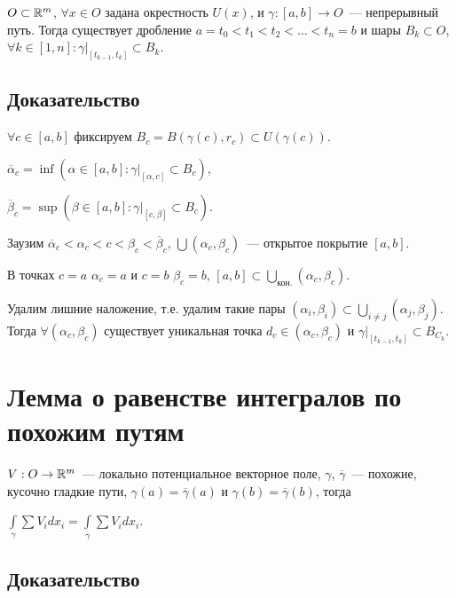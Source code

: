 \documentclass{article}
\begin{document}
        $O \subset \mathbb{R}^m$, $\forall x \in O$ задана окрестность $U(x)$, и $\gamma : [a, b] \rightarrow O$~--- непрерывный путь. Тогда существует дробление $a = t_0 < t_1 < t_2 < \ldots < t_n = b$ и шары $B_k \subset O$, $\forall k \in [1, n] : \gamma \big|_{[t_{k - 1}, t_k]} \subset B_k$.
        
        \subsection{Доказательство}
        
            $\forall c \in [a, b]$ фиксируем $B_c = B \left( \gamma(c), r_c \right) \subset U \left( \gamma (c) \right)$.
            
            $\overline{\alpha}_c = \inf \left( \alpha \in [a, b] : \gamma \bigg|_{[\alpha, c]} \subset B_c \right)$,
            
            $\overline{\beta}_c = \sup \left( \beta \in [a, b] : \gamma \bigg|_{[c, \beta]} \subset B_c \right)$.
            
            Заузим $\overline{\alpha}_c < \alpha_c < c < \beta_c < \overline{\beta}_c$, $\bigcup ( \alpha_c, \beta_c )$~--- открытое покрытие $[a, b]$.
            
            В точках $c = a$ $\alpha_c = a$ и $c = b$ $\beta_c = b$, $[a, b] \subset \bigcup\limits_{\text{кон.}} \left( \alpha_c, \beta_c \right)$. 
            
            Удалим лишние наложение, т.е. удалим такие пары $(\alpha_i, \beta_i) \subset \bigcup\limits_{i \neq j} (\alpha_j, \beta_j)$. Тогда $\forall (\alpha_c, \beta_c)$ существует уникальная точка $d_c \in (\alpha_c, \beta_c)$ и $\gamma \bigg|_{[t_{k - 1}, t_k]} \subset B_{C_k}$.
            
    \newpage
    
    \section{Лемма о равенстве интегралов по похожим путям}
    
        $V : O \rightarrow \mathbb{R}^m$~--- локально потенциальное векторное поле, $\gamma$, $\overline{\gamma}$~--- похожие, кусочно гладкие пути, $\gamma(a) = \overline{\gamma}(a)$ и $\gamma(b) = \overline{\gamma}(b)$, тогда
        
        $\int\limits_{\gamma} \sum V_i dx_i = \int\limits_{\overline{\gamma}} \sum V_i dx_i$.
        
        \subsection{Доказательство}
        
\end{document}

